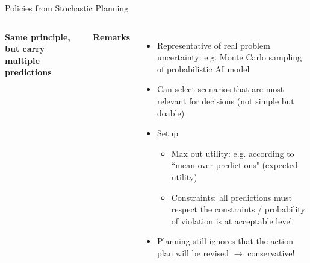 \documentclass[lecture]{beamer}
\begin{document}
\begin{frame}{\normalsize Policies from Stochastic Planning}
\begin{columns}
\begin{center}
\textbf{Same principle, but carry multiple predictions}
\end{center}
\textbf{Remarks}
\begin{itemize}
\scriptsize
\item Representative of real problem uncertainty: e.g. Monte Carlo sampling of probabilistic AI model
\item Can select scenarios that are most relevant for decisions (not simple but doable)
\item Setup
\begin{itemize}
\scriptsize
\item Max out utility: e.g. according to ``mean over predictions" (expected utility)
\item Constraints: all predictions must respect the constraints / probability of violation is at acceptable level
\end{itemize}
\item Planning still ignores that the action plan will be revised $\rightarrow$ conservative!
\end{itemize}
\end{columns}


\end{frame}
\end{document}
